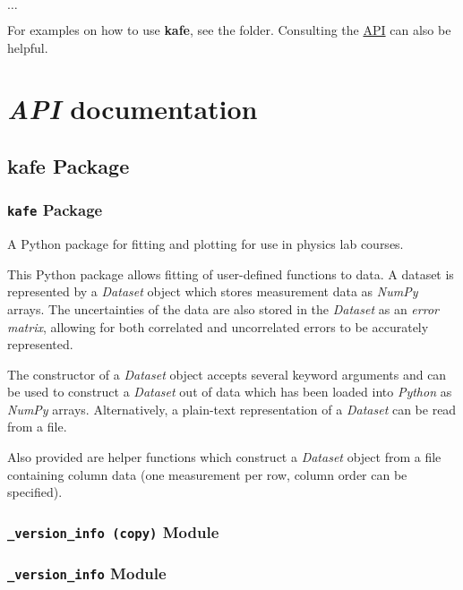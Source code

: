 \documentclass[a4paper,10pt,english]{sphinxmanual}
\begin{document}
$\ldots$

For examples on how to use \textbf{kafe}, see the  folder. Consulting
the {\hyperref[index:api]{API}} can also be helpful.


\chapter{\emph{API} documentation}
\label{index:api-documentation}

\section{kafe Package}
\label{index:api}\label{index:kafe-package}

\subsection{\texttt{kafe} Package}
\label{index:id1}\label{index:module-kafe.__init__}
A Python package for fitting and plotting for use in physics lab courses.

This Python package allows fitting of user-defined functions to data. A dataset is
represented by a \emph{Dataset} object which stores measurement data as \emph{NumPy} arrays.
The uncertainties of the data are also stored in the \emph{Dataset} as an \emph{error matrix},
allowing for both correlated and uncorrelated errors to be accurately represented.

The constructor of a \emph{Dataset} object accepts several keyword arguments and can be used
to construct a \emph{Dataset} out of data which has been loaded into \emph{Python} as \emph{NumPy} arrays.
Alternatively, a plain-text representation of a \emph{Dataset} can be read from a file.

Also provided are helper functions which construct a \emph{Dataset} object from a
file containing column data (one measurement per row, column order can be specified).


\subsection{\texttt{\_version\_info (copy)} Module}
\label{index:version-info-copy-module}\label{index:module-kafe._version_info(copy)}

\subsection{\texttt{\_version\_info} Module}
\label{index:module-kafe._version_info}\label{index:version-info-module}
\end{document}
